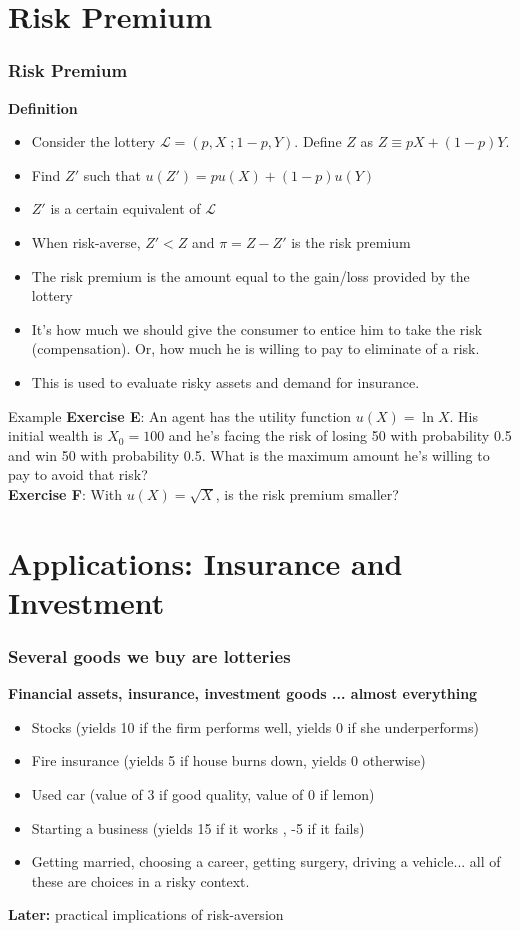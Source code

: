 \documentclass[handout]{beamer}
\newenvironment{iPar}[1]{\textbf{#1} \begin{itemize}}{\end{itemize}}
\newcommand{\mdp}{\medskip \pause}
\newcommand{\mc}{\mathcal}
\begin{document}
\section{Risk Premium}

\begin{frame}\frametitle{Risk Premium}

\begin{iPar}{Definition} \item Consider the lottery $\mc L =
(p,X\;;1-p,Y)$. Define $Z$ as $Z \equiv pX+ (1-p)Y$. \item Find $Z'$ such that $u(Z') = pu(X) + (1-p)u(Y)$ \item $Z'$ is a certain equivalent of $\mc L$ \item When risk-averse, $Z' < Z$ and $
\pi = Z-Z'$ is the risk premium \item The risk premium is the amount equal to the gain/loss provided by the lottery \item It's how much we should give the consumer to entice him to take the risk (compensation). Or, how much he is willing to pay to eliminate of a risk. 
\item This is used to evaluate risky assets and demand for insurance. 
\end{iPar}

\end{frame}

\begin{frame}{Example}
\textbf{Exercise E}: An agent has the utility function $u(X)=\ln X$. His initial wealth is $X_0 = 100$ and he's facing the risk of losing 50 with probability 0.5 and win 50 with probability 0.5. What is the maximum amount he's willing to pay to avoid that risk? \\
\textbf{Exercise F}: With $u(X) = \sqrt X $, is the risk premium smaller?
\end{frame}


\section{Applications: Insurance and Investment}

\begin{frame}\frametitle{Several goods we buy are lotteries}
\begin{iPar}{Financial assets, insurance, investment goods ...
almost everything} \item Stocks (yields 10 if the firm performs well, yields 0 if she underperforms) \item Fire insurance (yields 5 if house burns down, yields 0 otherwise) \item Used car (value of 3 if good quality, value of 0 if lemon) \item
Starting a business (yields 15 if it works , -5 if it fails) \item Getting married, choosing a career, getting surgery, driving a vehicle... all of these are choices in a risky context. \end{iPar} \mdp \textbf{Later:} practical implications of risk-aversion \end{frame}
\end{document}
